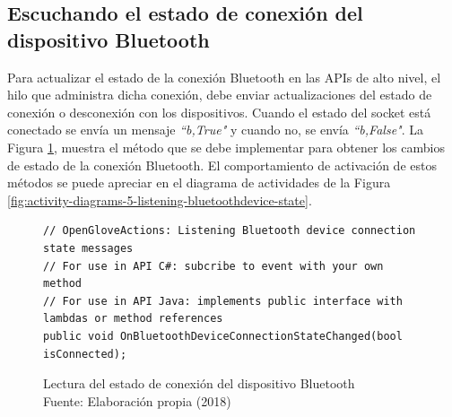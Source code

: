 \subsection{Escuchando el estado de conexión del dispositivo Bluetooth}
\label{subsection:reading-bluetooth-device-state}

Para actualizar el estado de la conexión Bluetooth en las APIs de alto nivel, el hilo que administra dicha conexión, debe enviar  actualizaciones del estado de conexión o desconexión con los dispositivos. Cuando el estado del socket está conectado se envía un mensaje  \textit{``b,True"}  y cuando no, se envía \textit{``b,False"}. La Figura \ref{fig:methods-5-listening-bluetoothdevice-state}, muestra el método que se debe implementar para obtener los cambios de estado de la conexión Bluetooth.  El comportamiento de activación de estos métodos se puede apreciar en el diagrama de actividades de la Figura \ref{fig:activity-diagrams-5-listening-bluetoothdevice-state}.

\begin{figure}[H]
  \begin{center}
\begin{lstlisting}
// OpenGloveActions: Listening Bluetooth device connection state messages
// For use in API C#: subcribe to event with your own method
// For use in API Java: implements public interface with lambdas or method references
public void OnBluetoothDeviceConnectionStateChanged(bool isConnected);
\end{lstlisting}
   	\captionsetup{justification=centering}
    \caption[Lectura del estado de conexión del dispositivo Bluetooth]{Lectura del estado de conexión del dispositivo Bluetooth\\Fuente: Elaboración propia (2018)}
    \label{fig:methods-5-listening-bluetoothdevice-state}
  \end{center}
\end{figure}

